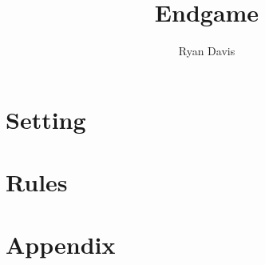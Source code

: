 \documentclass[12pt, twocolumn, letterpaper]{book}
\title{Endgame}
\author{Ryan Davis}
\begin{document}
\maketitle
\frontmatter
\tableofcontents
\mainmatter
\part{Setting}
\part{Rules}
\backmatter
\part{Appendix}
\end{document}

